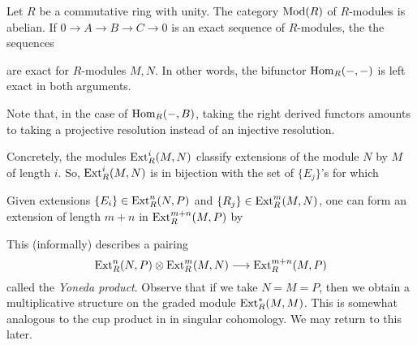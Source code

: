 Let $R$ be a commutative ring with unity. The category $\operatorname{Mod}(R)$ of $R$-modules
is abelian. If $0 \to A \to B \to C \to 0$ is an exact sequence of $R$-modules,
the the sequences
\begin{center}

\end{center}
are exact for $R$-modules $M, N$. In other words, the bifunctor $\operatorname{Hom}_{R}({-}, {-})$ is left exact in both arguments.

\begin{definition}
    The functors $\Ext_R^i(A, {-})$ (resp. $\Ext_R^i({-}, B)$) are defined to be the right derived functors of $\Hom_R(A, {-})}$ (resp. $\Hom_R({-}, B)}$).
\end{definition}

Note that, in the case of $\operatorname{Hom}_R({-}, B)$, taking the right derived functors amounts to taking a projective resolution instead of an injective resolution.

Concretely, the modules $\operatorname{Ext}_R^i(M, N)$ classify extensions of the module $N$ by $M$ of length $i$. So, $\operatorname{Ext}_R^i(M, N)$ is in bijection with the set of $\{E_j\}$'s for which
\begin{center}
\end{center}

Given extensions $\{E_i\} \in \operatorname{Ext}_R^n(N, P)$ and $\{R_j\} \in \operatorname{Ext}_R^m(M, N)$, one can form an extension of length $m + n$ in $\operatorname{Ext}_R^{m+n}(M, P)$ by
\begin{center}
\end{center}
This (informally) describes a pairing
\[
    \operatorname{Ext}_R^n(N, P) \otimes \operatorname{Ext}_R^m(M, N) \longrightarrow \operatorname{Ext}_R^{m+n}(M, P)
\]
called the \textit{Yoneda product}. Observe that if we take $N=M=P$, then we obtain a multiplicative structure on the graded module $\operatorname{Ext}_R^{\ast}(M, M)$. This is somewhat analogous to the cup product in in singular cohomology. We may return to this later.

